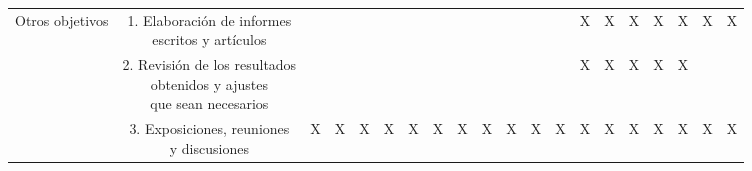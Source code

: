 \documentclass[10pt]{article}
\begin{document}
\begin{landscape}
\begin{table}[!htbp]
\begin{tabular}{|*{20}{c|}}
 
 Otros objetivos 
 & \makecell{1. Elaboración de informes \\ escritos y artículos}   &  &  &  &  &  &  &  &  &  &  &  & X & X & X & X & X & X & X \\ \cline{ 2- 20}
 & \makecell{2. Revisión de los resultados \\ obtenidos y ajustes  \\ que sean necesarios} &  &  &  &  &  &  &  &  &  &  &  & X & X & X & X & X &  &  \\
 \cline{ 2- 20}
 & \makecell{3. Exposiciones, reuniones \\y discusiones} & X & X & X & X & X & X & X & X & X & X & X & X & X & X & X & X & X & X \\
 \hline
\end{tabular}
\label{actividades}
\end{table}
\end{landscape}
\end{document}
